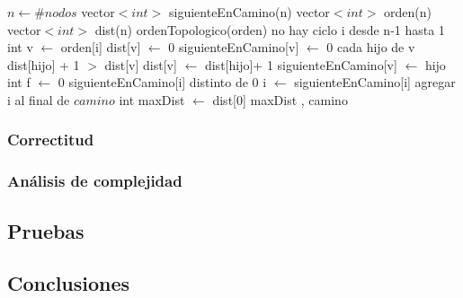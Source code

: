 \begin{algorithm}[H]
\caption{} 
\begin{codebox}
\li $n \gets \# nodos $
\li vector$<int>$ siguienteEnCamino(n)
\li vector$<int>$ orden(n)
\li vector$<int>$ dist(n)
\li ordenTopologico(orden)
\li \If no hay ciclo \Do
\li 	\For i desde n-1 hasta 1 \Do
\li		int v $\gets$ orden[i]
\li		dist[v] $\gets$ 0
\li 		siguienteEnCamino[v] $\gets$ 0
\li		\For cada hijo de v \Do
\li		  	\If dist[hijo] + 1 $>$ dist[v] \Do
\li				dist[v] $\gets$ dist[hijo]+ 1
\li				siguienteEnCamino[v] $\gets$ hijo
\li			\End
\li		\End
\li	\End
\li	int f $\gets$ 0
\li	\While siguienteEnCamino[i] distinto de 0 \Do
\li		i $\gets$ siguienteEnCamino[i]
\li		agregar i al final de $camino$
\li	\End
\li 	int maxDist $\gets$ dist[0]
\li 	\Return maxDist , camino	
\li \End
\li \Else \Do
\li {}
\End

\end{codebox}
\end{algorithm}

\subsubsection{Correctitud} 



\subsubsection{An\'alisis de complejidad}
 
 

\subsection{Pruebas}



\subsection{Conclusiones}
